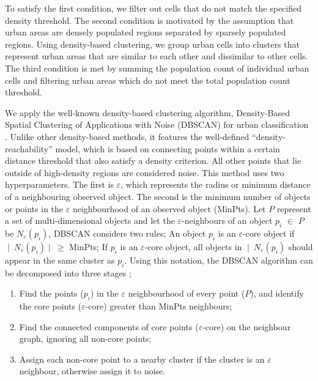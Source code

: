 \documentclass[review]{elsarticle}
\begin{document}
	To satisfy the first condition, we filter out cells that do not match the specified density threshold.
	The second condition is motivated by the assumption that urban areas are densely populated regions separated by sparsely populated regions.
	Using density-based clustering, we group urban cells into clusters that represent urban areas that are similar to each other and dissimilar to other cells.
	The third condition is met by summing the population count of individual urban cells and filtering urban areas which do not meet the total population count threshold.
	
	We apply the well-known density-based clustering algorithm, Density-Based Spatial Clustering of Applications with Noise (DBSCAN) for urban classification \cite{Esteretal1996}. 
	Unlike other density-based methods, it features the well-defined ``density-reachability'' model, which is based on connecting points within a certain distance threshold that also satisfy a density criterion. 
	All other points that lie outside of high-density regions are considered noise.
	This method uses two hyperparameters. 
	The first is $\varepsilon$, which represents the radius or minimum distance of a neighbouring observed object.
	The second is the minimum number of objects or points in the $\varepsilon$ neighbourhood of an observed object (MinPts).
	Let $P$ represent a set of multi-dimensional objects and let the $\varepsilon$-neighbours of an object $p_i$ $\in$ $P$ be $N_{\varepsilon} (p_i)$, DBSCAN considers two rules; 
	An object $p_i$ is an $\varepsilon$-core object if $∣ \ N_{\varepsilon} (p_i) ∣ \ \geq$ MinPts;
	If $p_i$ is an $\varepsilon$-core object, all objects in $∣ \ N_{\varepsilon} (p_i)$ should appear in the same cluster as $p_i$.
	Using this notation, the DBSCAN algorithm can be decomposed into three stages \cite{Schubertetal2017};
	\begin{enumerate}
		\item Find the points ($p_i$) in the $\varepsilon$ neighbourhood of every point ($P$), and identify the core points ($\varepsilon$-core) greater than MinPts neighbours;
		\item Find the connected components of core points ($\varepsilon$-core) on the neighbour graph, ignoring all non-core points;
		\item Assign each non-core point to a nearby cluster if the cluster is an $\varepsilon$ neighbour, otherwise assign it to noise. 
	\end{enumerate}
	
\end{document}
